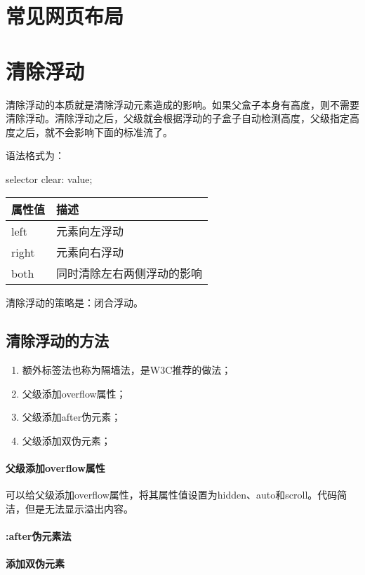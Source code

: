 \section{常见网页布局}
\section{清除浮动}
清除浮动的本质就是清除浮动元素造成的影响。如果父盒子本身有高度，则不需要清除浮动。清除浮动之后，父级就会根据浮动的子盒子自动检测高度，父级指定高度之后，就不会影响下面的标准流了。

语法格式为：
\begin{css}
	selector{
	clear: value;
	}
\end{css}
\begin{table}[H]
	\centering
	\begin{tabular}{ll}
		\hline
		属性值   & 描述            \\
		\hline
		left  & 元素向左浮动        \\
		right & 元素向右浮动        \\
		both  & 同时清除左右两侧浮动的影响 \\
		\hline
	\end{tabular}
\end{table}
清除浮动的策略是：闭合浮动。
\subsection{清除浮动的方法}
\begin{enumerate}
	\item 额外标签法也称为隔墙法，是W3C推荐的做法；
	\item 父级添加overflow属性；
	\item 父级添加after伪元素；
	\item 父级添加双伪元素；
\end{enumerate}
\paragraph{父级添加overflow属性} 可以给父级添加overflow属性，将其属性值设置为hidden、auto和scroll。代码简洁，但是无法显示溢出内容。

\paragraph{:after伪元素法}

\paragraph{添加双伪元素}
